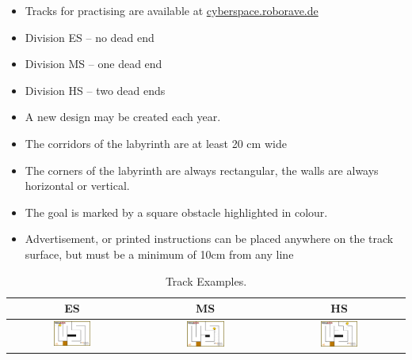 \documentclass[a4paper,12pt]{article}
\begin{document}
\begin{itemize}
	\item Tracks for practising are available at
\href{https://cyberspace.roborave.de}{cyberspace.roborave.de}
	\item Division ES – no dead end
	\item Division MS – one dead end
	\item Division HS – two dead ends
	\item A new design may be created each year.
	\item The corridors of the labyrinth are at least 20 cm wide
	\item The corners of the labyrinth are always rectangular, the walls
		are always horizontal or vertical.
	\item The goal is marked by a square obstacle highlighted in colour.
	\item Advertisement, or printed instructions can be placed anywhere on
		the track surface, but must be a minimum of 10cm from any line
\end{itemize}

\begin{center}
\begin{table}[H]
	\begin{tabular}{|c|c|c|} \hline
		ES & MS & HS \\
		\hline
\includegraphics[width=0.3\textwidth]{images/cyberspace/labyrinth_es.png}
&
\includegraphics[width=0.3\textwidth]{images/cyberspace/labyrinth_ms.png}
&
\includegraphics[width=0.3\textwidth]{images/cyberspace/labyrinth_hs.png}
\\
    		\hline
	\end{tabular}
\caption{\label{tab:table-name}Track Examples.}
\end{table}
\end{center}
\end{document}
